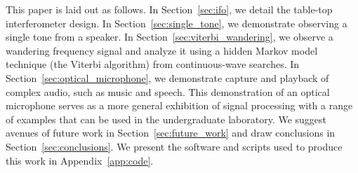 \documentclass[paper-main.tex]{subfiles}
\begin{document}
This paper is laid out as follows. 
In Section~\ref{sec:ifo}, we detail the table-top interferometer design. 
In Section~\ref{sec:single_tone}, we demonstrate observing a single tone from a speaker. 
In Section~\ref{sec:viterbi_wandering}, we observe a wandering frequency signal and analyze it using a hidden Markov model technique (the Viterbi algorithm) from continuous-wave searches. 
In Section~\ref{sec:optical_microphone}, we demonstrate capture and playback of complex audio, such as music and speech.
This demonstration of an optical microphone serves as a more general exhibition of signal processing with a range of examples that can be used in the undergraduate laboratory. 
We suggest avenues of future work in Section~\ref{sec:future_work} and draw conclusions in Section~\ref{sec:conclusions}. 
We present the software and scripts used to produce this work in Appendix~\ref{app:code}.
\end{document}
